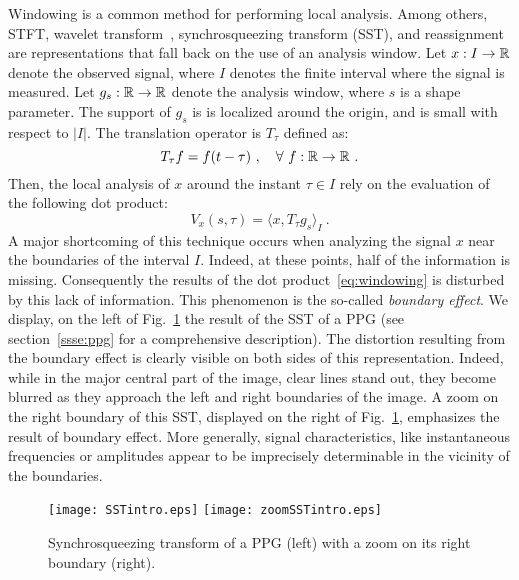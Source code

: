 \documentclass[twoside,letterpaper]{article}
\begin{document}
Windowing is a common method for performing local analysis. Among others, STFT, wavelet transform~\cite{Mallat99wavelet}, synchrosqueezing transform (SST), and reassignment~\cite{Auger13time} are representations that fall back on the use of an analysis window. Let $x:I\to{\mathbb R}$ denote the observed signal, where $I$ denotes the finite interval where the signal is measured. Let $g_s:{\mathbb R}\to{\mathbb R}$ denote the analysis window, where $s$ is a shape parameter. The support of $g_s$ is is localized around the origin, and is small with respect to $|I|$. The translation operator is $T_\tau$ defined as:
\[
T_\tau f = f(t-\tau)\ ,\quad \forall\ f:{\mathbb R}\to{\mathbb R}\ .
\]
Then, the local analysis of $x$ around the instant $\tau\in I$ rely on the evaluation of the following dot product:
\begin{equation}
V_x(s,\tau) = \langle x, T_\tau g_s \rangle_I \ .
\label{eq:windowing}
\end{equation}
A major shortcoming of this technique occurs when analyzing the signal $x$ near the boundaries of the interval $I$. Indeed, at these points, half of the information is missing. Consequently the results of the dot product~\ref{eq:windowing} is disturbed by this lack of information. This phenomenon is the so-called \emph{boundary effect}. We display, on the left of Fig.~\ref{fig:ex.intro} the result of the SST of a PPG (see section~\ref{ssse:ppg} for a comprehensive description). The distortion resulting from the boundary effect is clearly visible on both sides of this representation. Indeed, while in the major central part of the image, clear lines stand out, they become blurred as they approach the left and right boundaries of the image. A zoom on the right boundary of this SST, displayed on the right of Fig.~\ref{fig:ex.intro}, emphasizes the result of boundary effect. More generally, signal characteristics, like instantaneous frequencies or amplitudes appear to be imprecisely determinable in the vicinity of the boundaries.

\begin{figure}
\texttt{[image: SSTintro.eps]}
\texttt{[image: zoomSSTintro.eps]}
\caption{Synchrosqueezing transform of a PPG (left) with a zoom on its right boundary (right). }
\label{fig:ex.intro}
\end{figure}
\end{document}
